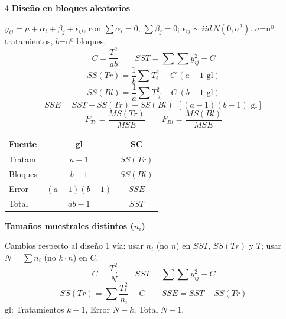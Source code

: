 \documentclass[9pt,a4paper]{article}
\newcommand{\bodysize}{\fontsize{9.2}{10.8}\selectfont}
\newcommand{\notesize}{\fontsize{7.8}{9.1}\selectfont}
\newcommand{\subsize}{\fontsize{10.5}{12.3}\selectfont\bfseries}
\newcommand{\topic}[2]{\subsize\textcolor{#1!60!black}{#2}\par\vspace{0.5pt}\bodysize}
\begin{document}
\begin{multicols}{4}
\topic{green}{Diseño en bloques aleatorios}
$y_{ij}=\mu+\alpha_i+\beta_j+\epsilon_{ij}$, con $\sum\alpha_i=0$, $\sum\beta_j=0$; $\epsilon_{ij}\sim iid\,N(0,\sigma^2)$. $a$=nº tratamientos, $b$=nº bloques.
\[
C=\frac{T_{..}^2}{ab} \qquad SST=\sum\sum y_{ij}^2-C
\]
\[
SS(Tr)=\frac{1}{b}\sum T_{i.}^2-C\ (a{-}1\text{ gl})
\]
\[
SS(Bl)=\frac{1}{a}\sum T_{.j}^2-C\ (b{-}1\text{ gl})
\]
{\notesize
\[
SSE=SST-SS(Tr)-SS(Bl) \ \ [(a-1)(b-1)\text{ gl}]
\]
}
\[
F_{Tr}=\frac{MS(Tr)}{MSE} \qquad F_{Bl}=\frac{MS(Bl)}{MSE}
\]

\begin{center}
\begin{tabular}{@{}l c c@{}}
\toprule
Fuente & gl & SC \\
\midrule
Tratam. & $a-1$ & $SS(Tr)$ \\
Bloques & $b-1$ & $SS(Bl)$ \\
Error & $(a{-}1)(b{-}1)$ & $SSE$ \\
Total & $ab-1$ & $SST$ \\
\bottomrule
\end{tabular}
\end{center}

\topic{green}{Tamaños muestrales distintos ($n_i$)}
Cambios respecto al diseño 1 vía: usar $n_i$ (no $n$) en $SST$, $SS(Tr)$ y $T$; usar $N=\sum n_i$ (no $k\cdot n$) en $C$.
\[
C=\frac{T_{..}^2}{N} \qquad SST=\sum\sum y_{ij}^2-C
\]
{\notesize
\[
SS(Tr)=\sum\frac{T_{i.}^2}{n_i}-C \qquad SSE=SST-SS(Tr)
\]
}
gl: Tratamientos $k-1$, Error $N-k$, Total $N-1$.

\end{multicols}
\end{document}
